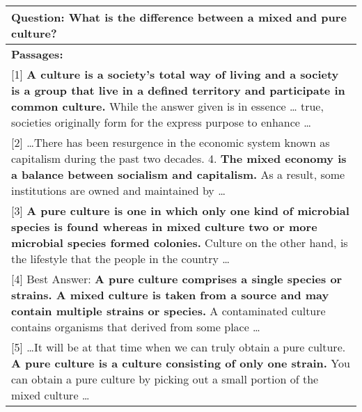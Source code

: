 \documentclass[11pt,a4paper]{article}
\begin{document}
\begin{comment}
$\cdots$ $\cdots$ \\
\hline
\textbf{Gold Answer:} Any frequency higher than the fundamental frequency of a sound. \\
\hline
\end{tabular}
\caption{An example from MS-MARCO. The text in bold is the top-1 predicted answer candidate from each passage according to the boundary model. The candidate from passage [4] is chosen as the final prediction by the model, while the correct answer is from passage [3] and can be verified by the answers from [1], [2]. } \label{tab:example}
\end{table*}
\end{comment}


\begin{table*}[htbp]
\small
\centering
\renewcommand{\arraystretch}{1.2}
\begin{tabular}{p{\textwidth}}
\hline
\textbf{Question: } What is the difference between a mixed and pure culture? \\
\hline
\textbf{Passages:} \\

[1] \textbf{A culture is a society's total way of living and a society is a group that live in a defined territory and participate in common culture.} While the answer given is in essence … true, societies originally form for the express purpose to enhance \ldots \\

[2] \ldots There has been resurgence in the economic system known as capitalism during the past two decades. 4. \textbf{The mixed economy is a balance between socialism and capitalism.} As a result, some institutions are owned and maintained by \ldots \\

[3] \textbf{A pure culture is one in which only one kind of microbial species is found whereas in mixed culture two or more microbial species formed colonies.} Culture on the other hand, is the lifestyle that the people in the country \ldots \\

[4] Best Answer: \textbf{A pure culture comprises a single species or strains. A mixed culture is taken from a source and may contain multiple strains or species.} A contaminated culture contains organisms that derived from some place \ldots \\

[5] \ldots It will be at that time when we can truly obtain a pure culture. \textbf{A pure culture is a culture consisting of only one strain.} You can obtain a pure culture by picking out a small portion of the mixed culture \ldots \\


\end{tabular}
\end{table*}
\end{document}
